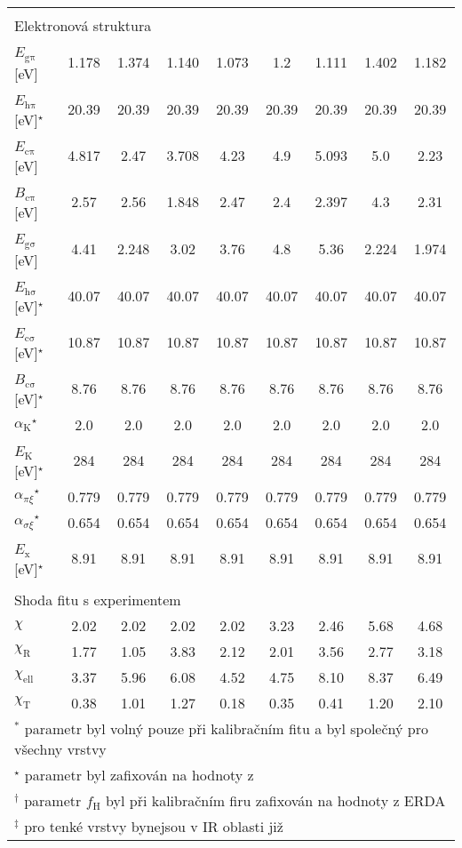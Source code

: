 \begin{tabular}{lcccccccc}
\multicolumn{9}{l}{}\\
\multicolumn{9}{l}{Elektronová struktura}\\
\hline
$E_\mathrm{g\pi}$\,[eV] & 1.178 & 1.374 & 1.140 & 1.073 & 1.2 & 1.111 & 1.402 & 1.182\\
$E_\mathrm{h\pi}$\,[eV]$^\star$ & 20.39 & 20.39 & 20.39 & 20.39 & 20.39 & 20.39 & 20.39 & 20.39\\
$E_\mathrm{c\pi}$\,[eV] & 4.817 & 2.47 & 3.708 & 4.23 & 4.9 & 5.093 & 5.0 & 2.23\\
$B_\mathrm{c\pi}$\,[eV] & 2.57 & 2.56 & 1.848 & 2.47 & 2.4 & 2.397 & 4.3 & 2.31\\
$E_\mathrm{g\sigma}$\,[eV] & 4.41 & 2.248 & 3.02 & 3.76 & 4.8 & 5.36 & 2.224 & 1.974\\
$E_\mathrm{h\sigma}$\,[eV]$^\star$ & 40.07 & 40.07 & 40.07 & 40.07 & 40.07 & 40.07 & 40.07 & 40.07\\
$E_\mathrm{c\sigma}$\,[eV]$^\star$ & 10.87 & 10.87 & 10.87 & 10.87 & 10.87 & 10.87 & 10.87 & 10.87\\
$B_\mathrm{c\sigma}$\,[eV]$^\star$ & 8.76 & 8.76 & 8.76 & 8.76 & 8.76 & 8.76 & 8.76 & 8.76\\
$\alpha_\mathrm{K}$$^\star$ & 2.0 & 2.0 & 2.0 & 2.0 & 2.0 & 2.0 & 2.0 & 2.0\\
$E_\mathrm{K}$\,[eV]$^\star$ & 284 & 284 & 284 & 284 & 284 & 284 & 284 & 284\\
$\alpha_{\pi\xi}$$^\star$ & 0.779 & 0.779 & 0.779 & 0.779 & 0.779 & 0.779 & 0.779 & 0.779\\
$\alpha_{\sigma\xi}$$^\star$ & 0.654 & 0.654 & 0.654 & 0.654 & 0.654 & 0.654 & 0.654 & 0.654\\
$E_\mathrm{x}$\,[eV]$^\star$ & 8.91 & 8.91 & 8.91 & 8.91 & 8.91 & 8.91 & 8.91 & 8.91\\

\multicolumn{9}{l}{}\\
\multicolumn{9}{l}{Shoda fitu s experimentem}\\
\hline
$\chi$ & 2.02 & 2.02 & 2.02 & 2.02 & 3.23 & 2.46 & 5.68 & 4.68\\
$\chi_\mathrm{R}$ & 1.77 & 1.05 & 3.83 & 2.12 & 2.01 & 3.56 & 2.77 & 3.18\\
$\chi_\mathrm{ell}$ & 3.37 & 5.96 & 6.08 & 4.52 & 4.75 & 8.10 & 8.37 & 6.49\\
$\chi_\mathrm{T}$ & 0.38 & 1.01 & 1.27 & 0.18 & 0.35 & 0.41 & 1.20 & 2.10\\


\hline
\multicolumn{9}{l}{$^\ast$ parametr byl volný pouze při kalibračním fitu a byl společný pro všechny vrstvy}\\
\multicolumn{9}{l}{$^\star$ parametr byl zafixován na hodnoty z \cite{Franta2011}}\\
\multicolumn{9}{l}{$^\dagger$ parametr $f_\mathrm{H}$ byl při kalibračním firu zafixován na hodnoty z ERDA}\\
\multicolumn{9}{l}{$^\ddagger$ pro tenké vrstvy bynejsou v IR oblasti již }\\

\end{tabular}
